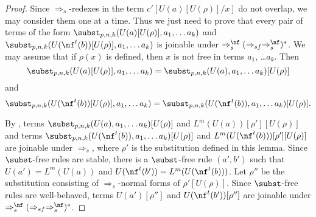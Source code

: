 \begin{proof}
Since $\Rightarrow_s$-redexes in the term $c'[U(a)[U(\rho)]/x]$ do not overlap, we may consider them one at a time.
Thus we just need to prove that every pair of terms of the form $\subst_{p,n,k}(U(a)[U(\rho)], a_1, \ldots a_k)$ and $\subst_{p,n,k}(U(\nf^t(b))[U(\rho)], a_1, \ldots a_k)$ is joinable under $\Rightarrow_s^\nf (\Rightarrow_{sf} \Rightarrow_s^\nf)^*$.
We may assume that if $\rho(x)$ is defined, then $x$ is not free in terms $a_1$, \ldots $a_k$.
Then
\[ \subst_{p,n,k}(U(a)[U(\rho)], a_1, \ldots a_k) = \subst_{p,n,k}(U(a), a_1, \ldots a_k)[U(\rho)] \]
and
\[ \subst_{p,n,k}(U(\nf^t(b))[U(\rho)], a_1, \ldots a_k) = \subst_{p,n,k}(U(\nf^t(b)), a_1, \ldots a_k)[U(\rho)]. \]

By , terms $\subst_{p,n,k}(U(a), a_1, \ldots a_k)[U(\rho)]$ and $L^m(U(a))[\rho'][U(\rho)]$ and terms $\subst_{p,n,k}(U(\nf^t(b)), a_1, \ldots a_k)[U(\rho)]$ and $L^m(U(\nf^t(b)))[\rho'][U(\rho)]$ are joinable under $\Rightarrow_s$,
where $\rho'$ is the substitution defined in this lemma.
Since $\subst$-free rules are stable, there is a $\subst$-free rule $(a',b')$ such that $U(a') = L^m(U(a))$ and $U(\nf^t(b')) = L^m(U(\nf^t(b)))$.
Let $\rho''$ be the substitution consisting of $\Rightarrow_s$-normal forms of $\rho'[U(\rho)]$.
Since $\subst$-free rules are well-behaved, terms $U(a')[\rho'']$ and $U(\nf^t(b'))[\rho'']$ are joinable under $\Rightarrow_s^\nf (\Rightarrow_{sf} \Rightarrow_s^\nf)^*$.
\end{proof}
